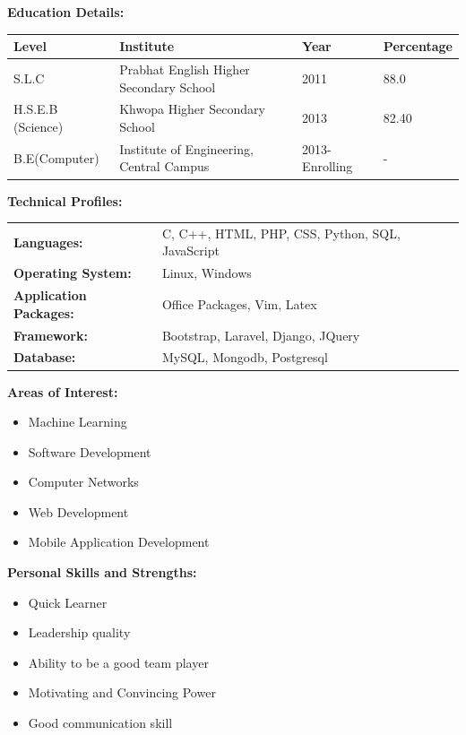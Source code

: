 \documentclass[hidelinks,a4paper, 12pt]{article}
\begin{document}
\vspace{8mm}
{\Large \textbf{ Education Details: } \\
}
\begin{tabular}{l l l l}
	\textbf{Level} & \textbf{Institute} &\textbf{Year} & \textbf{Percentage} \\ \hline
	S.L.C & Prabhat English Higher Secondary School & 2011 & 88.0 \\ \hline
	H.S.E.B (Science) & Khwopa Higher Secondary School & 2013 & 82.40 \\ \hline
	B.E(Computer) & Institute of Engineering, Central Campus & 2013-Enrolling & - \\ \hline
\end{tabular}

\vspace{8mm}
{\Large \textbf{ Technical Profiles: } \\
}
\begin{tabular}{l l}
	\textbf{Languages:} & C, C++, HTML, PHP, CSS, Python, SQL, JavaScript \\
	\textbf{Operating System:} &  Linux, Windows \\
	\textbf{Application Packages:} & Office Packages, Vim, Latex \\ 
	\textbf{Framework: } & Bootstrap, Laravel, Django, JQuery \\
    \textbf{Database:} & MySQL, Mongodb, Postgresql
	
\end{tabular}

\vspace{8mm}
{\Large \textbf{Areas of Interest:} \\
}
\vspace{-5mm}
\begin{itemize}[noitemsep]
\addtolength{\leftskip}{8mm}	
    \item Machine Learning
	\item Software Development
	\item Computer Networks
	\item Web Development
	\item Mobile Application Development

\end{itemize}

\vspace{8mm}
{\Large \textbf{Personal Skills and Strengths:}\\
}
\vspace{-5mm}
\begin{itemize}[noitemsep]
\addtolength{\leftskip}{8mm}
	\item Quick Learner
	\item Leadership quality
	\item Ability to be a good team player
	\item Motivating and Convincing Power
	\item Good communication skill
\end{itemize}
\end{document}
